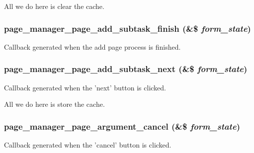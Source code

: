 All we do here is clear the cache. \hypertarget{page_8admin_8inc_a0c2a86a6b35111414cc9dfd5d7614e27}{
\subsubsection[{page\_\-manager\_\-page\_\-add\_\-subtask\_\-finish}]{\setlength{\rightskip}{0pt plus 5cm}page\_\-manager\_\-page\_\-add\_\-subtask\_\-finish (\&\$ {\em form\_\-state})}}
\label{page_8admin_8inc_a0c2a86a6b35111414cc9dfd5d7614e27}
Callback generated when the add page process is finished. \hypertarget{page_8admin_8inc_ad2c4abd104fc2441e26adb971ed53991}{
\subsubsection[{page\_\-manager\_\-page\_\-add\_\-subtask\_\-next}]{\setlength{\rightskip}{0pt plus 5cm}page\_\-manager\_\-page\_\-add\_\-subtask\_\-next (\&\$ {\em form\_\-state})}}
\label{page_8admin_8inc_ad2c4abd104fc2441e26adb971ed53991}
Callback generated when the 'next' button is clicked.

All we do here is store the cache. \hypertarget{page_8admin_8inc_a7a8694f4f7b039a730ea806acaa82ba6}{
\subsubsection[{page\_\-manager\_\-page\_\-argument\_\-cancel}]{\setlength{\rightskip}{0pt plus 5cm}page\_\-manager\_\-page\_\-argument\_\-cancel (\&\$ {\em form\_\-state})}}
\label{page_8admin_8inc_a7a8694f4f7b039a730ea806acaa82ba6}
Callback generated when the 'cancel' button is clicked.

